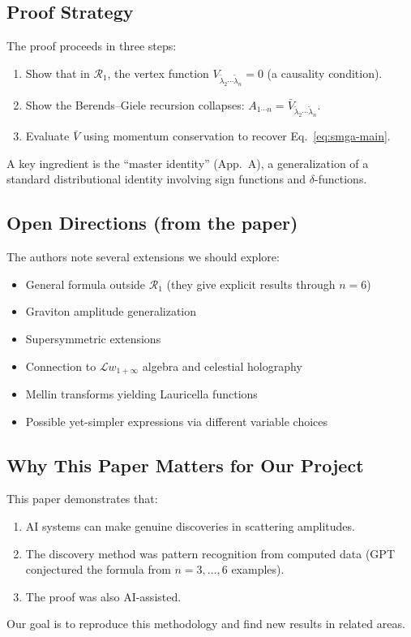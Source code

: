 \subsection{Proof Strategy}

The proof proceeds in three steps:
\begin{enumerate}
\item Show that in $\mathcal{R}_1$, the vertex function $V_{\tilde\lambda_2\cdots\tilde\lambda_n} = 0$ (a causality condition).
\item Show the Berends--Giele recursion collapses: $A_{1\cdots n} = \bar{V}_{\tilde\lambda_2\cdots\tilde\lambda_n}$.
\item Evaluate $\bar{V}$ using momentum conservation to recover Eq.~\eqref{eq:smga-main}.
\end{enumerate}

A key ingredient is the ``master identity'' (App.~A), a generalization of a standard distributional identity involving sign functions and $\delta$-functions.

\subsection{Open Directions (from the paper)}

The authors note several extensions we should explore:
\begin{itemize}
\item General formula outside $\mathcal{R}_1$ (they give explicit results through $n=6$)
\item Graviton amplitude generalization
\item Supersymmetric extensions
\item Connection to $\mathcal{L}w_{1+\infty}$ algebra and celestial holography
\item Mellin transforms yielding Lauricella functions
\item Possible yet-simpler expressions via different variable choices
\end{itemize}

\subsection{Why This Paper Matters for Our Project}

This paper demonstrates that:
\begin{enumerate}
\item AI systems can make genuine discoveries in scattering amplitudes.
\item The discovery method was pattern recognition from computed data (GPT conjectured the formula from $n=3,\ldots,6$ examples).
\item The proof was also AI-assisted.
\end{enumerate}

Our goal is to reproduce this methodology and find new results in related areas.

\newpage
